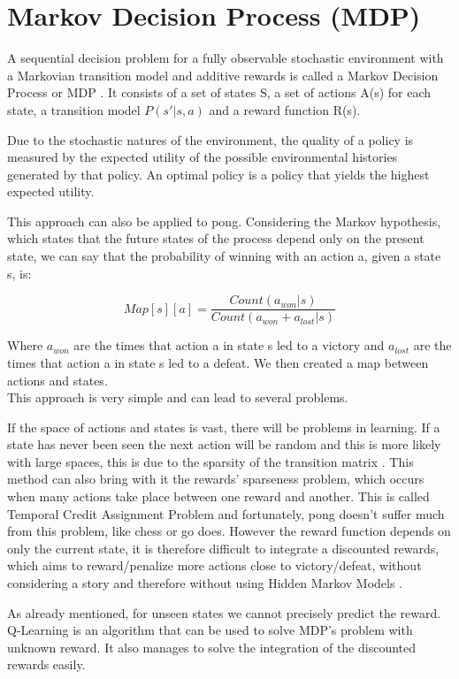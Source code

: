 \section{Markov Decision Process (MDP)}

A sequential decision problem for a fully observable stochastic environment with a Markovian transition model and additive rewards is called a Markov Decision Process or MDP \cite{russell2002artificial}.
It consists of a set of states S, a set of actions A(s) for each state, a transition model 
 $P(s' | s, a)$ and a reward function R(s).

Due to the stochastic natures of the environment, the quality of a policy is measured by the expected utility of the possible environmental histories generated by that policy. An optimal policy is a policy that yields the highest expected utility.

This approach can also be applied to pong. 
Considering the Markov hypothesis, which states that the future states of the process depend only on the present state, we can say that the probability of winning with an action a, given a state s, is:

\[ { Map[s][a] = \frac{ Count(a_{won} | s) }{ Count(a_{won} + a_{lost} | s) } } \]

Where $a_{won}$ are the times that action a in state s led to a victory and 
$a_{lost}$ are the times that action a in state s led to a defeat.
We then created a map between actions and states. \\
 
This approach is very simple and can lead to several problems.

If the space of actions and states is vast, there will be problems in learning. 
If a state has never been seen the next action will be random and this is more 
likely with large spaces, this is due to the sparsity of the transition matrix \cite{silver2015}.
This method can also bring with it the rewards' sparseness problem, which occurs when many 
actions take place between one reward and another. This is called Temporal Credit Assignment Problem \cite{sutton1984temporal}
and fortunately, pong doesn't suffer much from this problem, like chess or go does.
However the reward function depends on only the current state, it is 
therefore difficult to integrate a discounted rewards, which aims to reward/penalize 
more actions close to victory/defeat, without considering a story and therefore 
without using Hidden Markov Models \cite{silver2015}.

As already mentioned, for unseen states we cannot precisely predict the reward. 
Q-Learning is an algorithm that can be used to solve MDP's problem with unknown reward.
It also manages to solve the integration of the discounted rewards easily.










